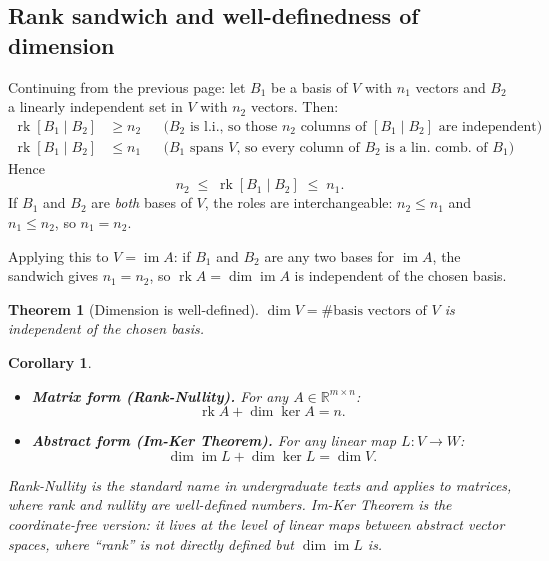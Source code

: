 \documentclass[11pt]{article}
\theoremstyle{definition}
\theoremstyle{plain}
\newtheorem{theorem}{Theorem}[section]
\newtheorem{corollary}{Corollary}[section]
\begin{document}
\subsection{Rank sandwich and well-definedness of dimension}

Continuing from the previous page: let $B_1$ be a basis of $V$ with $n_1$ vectors and
$B_2$ a linearly independent set in $V$ with $n_2$ vectors.  Then:
\begin{align*}
  \operatorname{rk}[B_1 \mid B_2] &\geq n_2
  &&\text{($B_2$ is l.i., so those $n_2$ columns of $[B_1\mid B_2]$ are independent)}\\
  \operatorname{rk}[B_1 \mid B_2] &\leq n_1
  &&\text{($B_1$ spans $V$, so every column of $B_2$ is a lin.\ comb.\ of $B_1$)}
\end{align*}
Hence
\[
  n_2 \;\leq\; \operatorname{rk}[B_1 \mid B_2] \;\leq\; n_1.
\]
If $B_1$ and $B_2$ are \emph{both} bases of $V$, the roles are interchangeable:
$n_2 \leq n_1$ and $n_1 \leq n_2$, so $\boxed{n_1 = n_2}$.

\noindent
Applying this to $V = \operatorname{im}A$: if $B_1$ and $B_2$ are any two
bases for $\operatorname{im}A$, the sandwich gives $n_1 = n_2$, so
$\operatorname{rk}A = \dim\operatorname{im}A$ is independent of the chosen
basis.

\begin{theorem}[Dimension is well-defined]
  $\dim V = \#\text{basis vectors of }V$ is independent of the chosen basis.
\end{theorem}

\begin{corollary}
  \leavevmode
  \begin{itemize}
    \item \textbf{Matrix form (Rank-Nullity).}
      For any $A \in \mathbb{R}^{m \times n}$:
      \[
        \operatorname{rk}A + \dim\ker A = n.
      \]
    \item \textbf{Abstract form (Im-Ker Theorem).}
      For any linear map $L : V \to W$:
      \[
        \dim\operatorname{im}L + \dim\ker L = \dim V.
      \]
  \end{itemize}
  \emph{Rank-Nullity} is the standard name in undergraduate texts and applies
  to matrices, where rank and nullity are well-defined numbers.
  \emph{Im-Ker Theorem} is the coordinate-free version: it lives at the level
  of linear maps between abstract vector spaces, where ``rank'' is not
  directly defined but $\dim\operatorname{im}L$ is.
\end{corollary}
\end{document}

